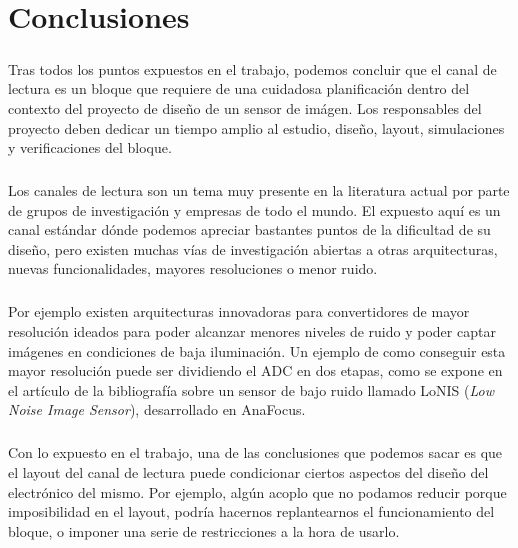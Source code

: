 \chapter{Conclusiones}

\paragraph{}
Tras todos los puntos expuestos en el trabajo, podemos concluir que el canal de
lectura es un bloque que requiere de una cuidadosa planificación dentro del
contexto del proyecto de diseño de un sensor de imágen. Los responsables del
proyecto deben dedicar un tiempo amplio al estudio, diseño, layout, simulaciones
y verificaciones del bloque.

\paragraph{}
Los canales de lectura son un tema muy presente en la literatura actual por parte
de grupos de investigación y empresas de todo el mundo. El expuesto aquí es un
canal estándar dónde podemos apreciar bastantes puntos de la dificultad de su
diseño, pero existen muchas vías de investigación abiertas a otras arquitecturas,
nuevas funcionalidades, mayores resoluciones o menor ruido.

\paragraph{}
Por ejemplo existen arquitecturas innovadoras para convertidores de mayor resolución
ideados para poder alcanzar menores niveles de ruido y poder captar imágenes en
condiciones de baja iluminación. Un ejemplo de como conseguir esta mayor resolución
puede ser dividiendo el ADC en dos etapas, como se expone en el artículo de la
bibliografía\cite{Gonzalez-Charlet2015:Low_noise} sobre un sensor de bajo ruido
llamado LoNIS (\textit{Low Noise Image Sensor}), desarrollado en AnaFocus\cite{anafocus}.

\paragraph{}
Con lo expuesto en el trabajo, una de las conclusiones que podemos sacar es que
el layout del canal de lectura puede condicionar ciertos aspectos del diseño del
electrónico del mismo. Por ejemplo, algún acoplo que no podamos reducir porque
imposibilidad en el layout, podría hacernos replantearnos el funcionamiento
del bloque, o imponer una serie de restricciones a la hora de usarlo.

